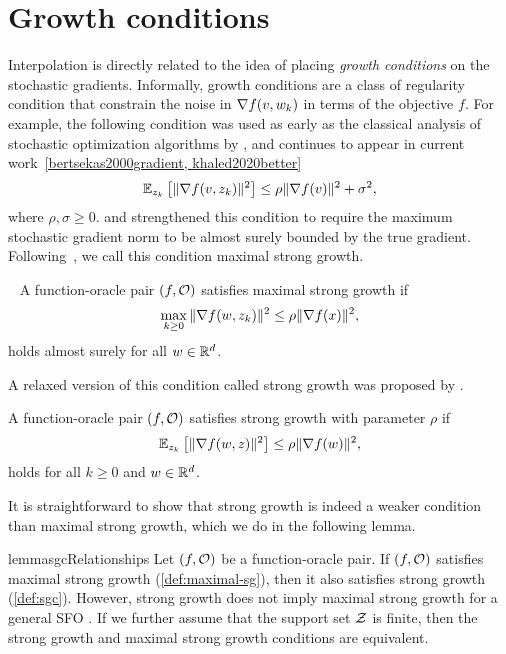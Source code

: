 \section{Growth conditions}\label{sec:growth_conditions}

Interpolation is directly related to the idea of placing \emph{growth conditions} on the stochastic gradients.
Informally, growth conditions are a class of regularity condition that constrain the noise in \( \grad(v, \wk) \) in terms of the objective \( f \).
For example, the following condition was used as early as the classical analysis of stochastic optimization algorithms by \citet{poljak1973pseudogradient}, and continues to appear in current work~\ref{bertsekas2000gradient, khaled2020better}  
\[ \Ek \sbr{\norm{\grad(v, \zk)}^2} \leq \rho \norm{\grad(v)}^2 + \sigma^2,  \]
where \( \rho, \sigma \geq 0 \).
\citet{tseng1998incremental} and \citet{solodov1998incremental} strengthened this condition to require the maximum stochastic gradient norm to be almost surely bounded by the true gradient.
Following~\citet{khaled2020better}, we call this condition maximal strong growth.
\begin{definition}~\label{def:maximal-sg}
    A function-oracle pair \( \rbr{f, \oracle{}} \) satisfies maximal strong growth if  
    \begin{align*}
        \max_{k \geq 0} \norm{\grad(\w, \zk)}^2 \leq \rho \norm{\grad(x)}^2, 
    \end{align*}
    holds almost surely for all \( \w \in \R^d \). 
\end{definition}
A relaxed version of this condition called strong growth was proposed by \citet{vaswani2019fast}.
\begin{definition}\label{def:sgc}
    A function-oracle pair \( \rbr{f, \oracle{}} \) satisfies strong growth with parameter \(\rho \) if
    \[ \Ek \sbr{\norm{\grad(\w, \z)}^2} \leq \rho \norm{\grad(\w)}^2, \]
    holds for all \( k \geq 0 \) and \( \w \in \R^d \).
\end{definition}
It is straightforward to show that strong growth is indeed a weaker condition than maximal strong growth, which we do in the following lemma.
\begin{restatable}{lemma}{sgcRelationships}\label{thm:sgc-relationships}
    Let \( \rbr{f, \oracle{}} \) be a function-oracle pair. 
    If \( \rbr{f, \oracle{}} \) satisfies maximal strong growth (\autoref{def:maximal-sg}), then it also satisfies strong growth (\autoref{def:sgc}).
    However, strong growth does not imply maximal strong growth for a general SFO \oracle{}. 
    If we further assume that the support set \( \calZ \) is finite, then the strong growth and maximal strong growth conditions are equivalent. 
\end{restatable} 

